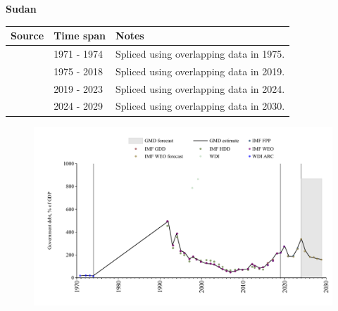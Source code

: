 \documentclass[12pt,a4paper,landscape]{article}
\begin{document}
\begin{adjustbox}{max totalsize={\paperwidth}{\paperheight},center}
\begin{minipage}[t][\textheight][t]{\textwidth}
\vspace*{0.5cm}
{}
\begin{center}
{\Large\bfseries Sudan}
\end{center}
\vspace{0.5cm}
\begin{table}[H]
\centering
\small
\begin{tabular}{|l|l|l|}
\hline
\textbf{Source} & \textbf{Time span} & \textbf{Notes} \\
\hline
\rowcolor{white}\cite{WDI_ARC}& 1971 - 1974 &Spliced using overlapping data in 1975.\\
\rowcolor{lightgray}\cite{IMF_GDD}& 1975 - 2018 &Spliced using overlapping data in 2019.\\
\rowcolor{white}\cite{IMF_FPP}& 2019 - 2023 &Spliced using overlapping data in 2024.\\
\rowcolor{lightgray}\cite{IMF_WEO_forecast}& 2024 - 2029 &Spliced using overlapping data in 2030.\\
\hline
\end{tabular}
\end{table}
\begin{figure}[H]
\centering
\includegraphics[width=\textwidth,height=0.6\textheight,keepaspectratio]{graphs/SDN_govdebt_GDP.pdf}
\end{figure}
\end{minipage}
\end{adjustbox}
\end{document}
